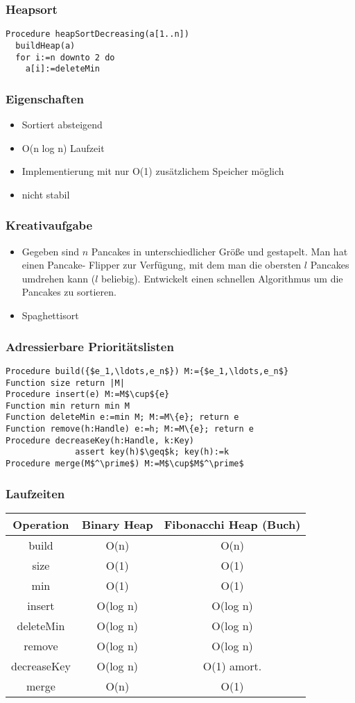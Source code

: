 \begin{frame}[fragile]
\frametitle{Heapsort}
\begin{lstlisting}
Procedure heapSortDecreasing(a[1..n])
  buildHeap(a)
  for i:=n downto 2 do
    a[i]:=deleteMin
\end{lstlisting}
\end{frame}

\begin{frame}
\frametitle{Eigenschaften}
\begin{itemize}
\item Sortiert absteigend\pause
\item O(n log n) Laufzeit
\item Implementierung mit nur O(1) zusätzlichem Speicher möglich\pause
\item nicht stabil
\end{itemize}
\end{frame}

\begin{frame}
\frametitle{Kreativaufgabe}
\begin{itemize}
\item Gegeben sind $n$ Pancakes in unterschiedlicher Größe und gestapelt. Man hat einen Pancake-
Flipper zur Verfügung, mit dem man die obersten $l$ Pancakes umdrehen kann ($l$ beliebig).
Entwickelt einen schnellen Algorithmus um die Pancakes zu sortieren.\pause
\item Spaghettisort
\end{itemize}
\end{frame}

\begin{frame}[fragile]
\frametitle{Adressierbare Prioritätslisten}
\begin{lstlisting}
Procedure build({$e_1,\ldots,e_n$}) M:={$e_1,\ldots,e_n$}
Function size return |M|
Procedure insert(e) M:=M$\cup${e}
Function min return min M
Function deleteMin e:=min M; M:=M\{e}; return e
Function remove(h:Handle) e:=h; M:=M\{e}; return e
Procedure decreaseKey(h:Handle, k:Key)
              assert key(h)$\geq$k; key(h):=k
Procedure merge(M$^\prime$) M:=M$\cup$M$^\prime$
\end{lstlisting}
\end{frame}

\begin{frame}
\frametitle{Laufzeiten}
\begin{tabular}{c|c|c}
Operation & Binary Heap & Fibonacchi Heap (Buch) \\ \hline
build & O(n) & O(n) \\
size & O(1) & O(1) \\
min & O(1) & O(1) \\
insert & O(log n) & O(log n) \\
deleteMin & O(log n) & O(log n) \\
remove & O(log n) & O(log n) \\
decreaseKey & O(log n) & O(1) amort. \\
merge & O(n) & O(1)
\end{tabular}
\end{frame}
